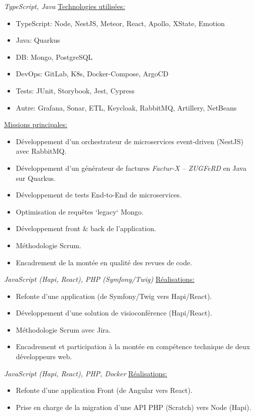 \documentclass[10pt,a4paper,sans]{moderncv}        %
\newcommand{\heart}{\ensuremath\heartsuit}
\newcommand{\realisations}{\underline{Réalisations:}}
\newcommand{\technos}{\underline{Technologies utilisées:}}
\newcommand{\missions}{\underline{Missions principales:}}
\begin{document}
{
	\emph{TypeScript, Java} \newline %
	\technos
	\begin{itemize}%
		\item TypeScript: Node, NestJS, Meteor, React, Apollo, XState, Emotion
		\item Java: Quarkus 
		\item DB: Mongo, PostgreSQL
		\item DevOps: GitLab, K8s, Docker-Compose, ArgoCD
		\item Tests: JUnit, Storybook, Jest, Cypress
		\item Autre: Grafana, Sonar, ETL, Keycloak, RabbitMQ, Artillery, NetBeans
	\end{itemize}
	\missions
	\begin{itemize}%
		\item Développement d'un orchestrateur de microservices event-driven (NestJS) avec RabbitMQ.
		\item Développement d'un générateur de factures \emph{Factur-X – ZUGFeRD} en Java sur Quarkus.
		\item Développement de tests End-to-End de microservices.
		\item Optimisation de requêtes `legacy` Mongo.
		\item Développement front \& back de l'application.
		\item Méthodologie Scrum.
		\item Encadrement de la montée en qualité des revues de code.
	\end{itemize}
}
\cvline{2021--2022}{\emph{Congé de paternité \heart}}
{
	\emph{JavaScript (Hapi, React), PHP (Symfony/Twig)}\newline %
	\realisations
	\begin{itemize}%
		\item Refonte d'une application (de Symfony/Twig vers Hapi/React).
		\item Développement d'une solution de visioconférence (Hapi/React).
		\item Méthodologie Scrum avec Jira.
		\item Encadrement et participation à la montée en compétence technique de deux développeurs web.
	\end{itemize}
}
{
	\emph{JavaScript (Hapi, React), PHP, Docker} \newline %
	\realisations
	\begin{itemize}%
		\item Refonte d'une application Front (de Angular vers React).
		\item Prise en charge de la migration d'une API PHP (Scratch) vers Node (Hapi).
	\end{itemize}
}
\end{document}
